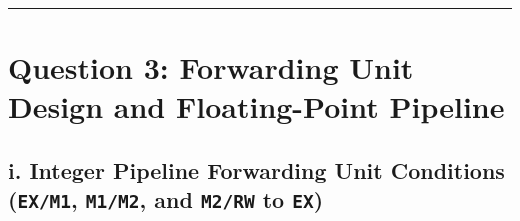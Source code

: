 \documentclass[11pt, a4paper]{article}
\begin{document}
\vspace{8pt}
\hrule
\vspace{8pt}




\section*{\textcolor{accent}{Question 3: Forwarding Unit Design and Floating-Point Pipeline}}

\subsection*{i. Integer Pipeline Forwarding Unit Conditions (\texttt{EX/M1}, \texttt{M1/M2}, and \texttt{M2/RW} to \texttt{EX})}
\end{document}
